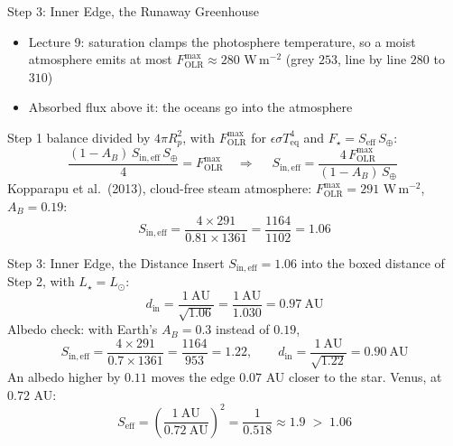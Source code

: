 \documentclass[aspectratio=169, 11pt]{beamer}
\begin{document}
\begin{frame}{Step 3: Inner Edge, the Runaway Greenhouse}
  \small
  \begin{itemize}\setlength\itemsep{3pt}
    \item Lecture 9: saturation clamps the photosphere temperature, so a moist atmosphere emits at most $F_{\mathrm{OLR}}^{\max} \approx 280$ W\,m$^{-2}$ (grey $253$, line by line $280$ to $310$)
    \item Absorbed flux above it: the oceans go into the atmosphere
  \end{itemize}
  Step 1 balance divided by $4\pi R_p^2$, with $F_{\mathrm{OLR}}^{\max}$ for $\epsilon\sigma T_{\mathrm{eq}}^4$ and $F_\star = S_{\mathrm{eff}}\,S_\oplus$:
  \[
    \frac{(1 - A_B)\,S_{\mathrm{in,eff}}\,S_\oplus}{4} = F_{\mathrm{OLR}}^{\max}
    \quad\Rightarrow\quad
    \boxed{\;S_{\mathrm{in,eff}} = \frac{4\,F_{\mathrm{OLR}}^{\max}}{(1 - A_B)\,S_\oplus}\;}
  \]
  Kopparapu et al.\ (2013), cloud-free steam atmosphere: $F_{\mathrm{OLR}}^{\max} = 291$ W\,m$^{-2}$, $A_B = 0.19$:
  \[
    S_{\mathrm{in,eff}} = \frac{4 \times 291}{0.81 \times 1361} = \frac{1164}{1102} = 1.06
  \]
\end{frame}

\begin{frame}{Step 3: Inner Edge, the Distance}
  \small
  Insert $S_{\mathrm{in,eff}} = 1.06$ into the boxed distance of Step 2, with $L_\star = L_\odot$:
  \[
    d_{\mathrm{in}} = \frac{1\ \mathrm{AU}}{\sqrt{1.06}} = \frac{1\ \mathrm{AU}}{1.030} = 0.97\ \mathrm{AU}
  \]
  Albedo check: with Earth's $A_B = 0.3$ instead of $0.19$,
  \[
    S_{\mathrm{in,eff}} = \frac{4 \times 291}{0.7 \times 1361} = \frac{1164}{953} = 1.22,
    \qquad
    d_{\mathrm{in}} = \frac{1\ \mathrm{AU}}{\sqrt{1.22}} = 0.90\ \mathrm{AU}
  \]
  An albedo higher by $0.11$ moves the edge $0.07$ AU closer to the star.
  \vskip4pt
  Venus, at $0.72$ AU:
  \[
    S_{\mathrm{eff}} = \left(\frac{1\ \mathrm{AU}}{0.72\ \mathrm{AU}}\right)^2 = \frac{1}{0.518} \approx 1.9 \;>\; 1.06
  \]
\end{frame}
\end{document}
